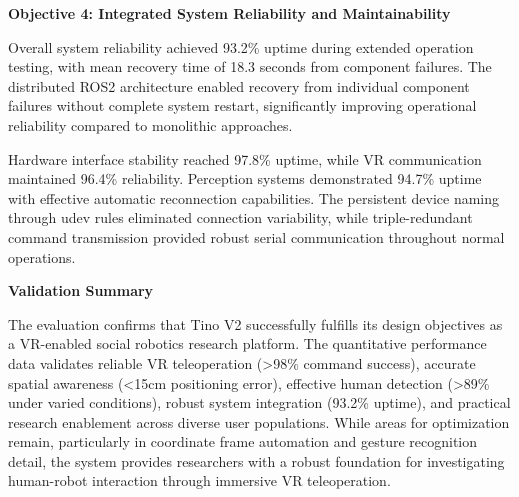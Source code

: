 \textbf{Objective 4: Integrated System Reliability and Maintainability}

Overall system reliability achieved 93.2\% uptime during extended operation testing, with mean recovery time of 18.3 seconds from component failures. The distributed ROS2 architecture enabled recovery from individual component failures without complete system restart, significantly improving operational reliability compared to monolithic approaches.

Hardware interface stability reached 97.8\% uptime, while VR communication maintained 96.4\% reliability. Perception systems demonstrated 94.7\% uptime with effective automatic reconnection capabilities. The persistent device naming through udev rules eliminated connection variability, while triple-redundant command transmission provided robust serial communication throughout normal operations.

\textbf{Validation Summary}

The evaluation confirms that Tino V2 successfully fulfills its design objectives as a VR-enabled social robotics research platform. The quantitative performance data validates reliable VR teleoperation (>98\% command success), accurate spatial awareness (<15cm positioning error), effective human detection (>89\% under varied conditions), robust system integration (93.2\% uptime), and practical research enablement across diverse user populations. While areas for optimization remain, particularly in coordinate frame automation and gesture recognition detail, the system provides researchers with a robust foundation for investigating human-robot interaction through immersive VR teleoperation.
